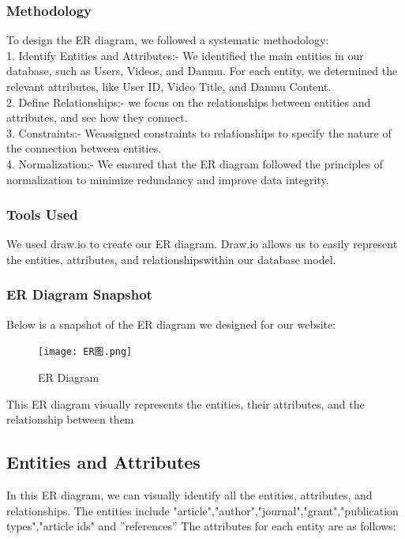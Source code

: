 \documentclass{article}
\begin{document}
 \subsubsection{Methodology}
  To design the ER diagram, we followed a systematic methodology:\\
 1. Identify Entities and Attributes:- We identified the main entities in our database, such as Users, Videos, and
 Danmu. For each entity, we determined the relevant attributes, like User ID,
 Video Title, and Danmu Content.\\
 2. Define Relationships:- we focus on the relationships between entities and attributes, and see how they
 connect.\\
 3. Constraints:- Weassigned constraints to relationships to specify the nature of the connection
 between entities.\\
 4. Normalization:- We ensured that the ER diagram followed the principles of normalization to
 minimize redundancy and improve data integrity.
\subsubsection{Tools Used}
We used draw.io to create our ER diagram. Draw.io allows us to easily represent the entities, attributes, and relationshipswithin our database model.
\newpage
\subsubsection{ER Diagram Snapshot}
Below is a snapshot of the ER diagram we designed for our website:

\begin{figure}[h]
\centering %
\texttt{[image: ER图.png]} %
\caption{ER Diagram} %
\label{fig:引用标签} %
\end{figure}
 

This ER diagram visually represents the entities, their attributes, and the relationship between them
\subsection{Entities and Attributes}
In this ER diagram, we can visually identify all the entities, attributes, and relationships. The entities include "article","author","journal","grant","publication types","article ids" and ”references” The attributes for each entity are as follows:
\end{document}

